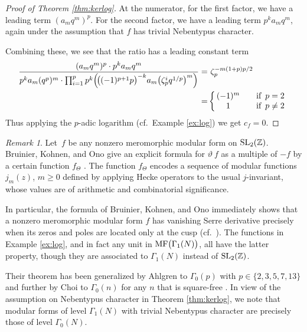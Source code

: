 \documentclass{gtpart}
\theoremstyle{definition}
\theoremstyle{remark}
\newtheorem{rmk}[equation]{Remark}
\newcommand{\mb}[1]{\mathbb{#1}}
\newcommand{\BZ}{{\mb Z}}
\newcommand{\MF}{{\rm MF}}
\newcommand{\G}{\Gamma}
\renewcommand{\=}{\approx}
\renewcommand{\-}{\sim}
\newcommand{\SL}{{\rm SL}}
\numberwithin{equation}{section}
\begin{document}
\begin{proof}[Proof of Theorem \ref{thm:kerlog}]
 At the numerator, for the first factor, we have a leading term $(a_m q^m)^p$.  
 For the second factor, we have a leading term $p^k a_m q^m$, again under the 
 assumption that $f$ has trivial Nebentypus character.  

 Combining these, we see that the ratio has a leading constant term 
 \[
  \begin{split}
   \frac{(a_m q^m)^p \cdot p^k a_m q^m}{p^k a_m (q^p)^m \cdot 
   \prod_{i=1}^p p^k \Big(\! \big( (-1)^{p + 1} p \big)^{-k} a_m 
   \big( \zeta_p^i q^{1/p} \big)^m \Big)} = & ~ \zeta_p^{-m (1 + p) p / 2} \\
   = & \left\{\!\!
        \begin{array}{cl}
         (-1)^m & \quad \text{if\, $p = 2$} \\
         1 & \quad \text{if\, $p \neq 2$} 
        \end{array}
       \right.
  \end{split}
 \]
 Thus applying the $p$-adic logarithm (cf.~Example \ref{ex:log}) we get 
 $c_f = 0$.  
\end{proof}

\begin{rmk}
 Let $\,f$ be any nonzero meromorphic modular form on $\SL_2(\BZ)$.  Bruinier, 
 Kohnen, and Ono give an explicit formula for $\vartheta ~\! f$ as a multiple of 
 $-f$ by a certain function $f_\Theta$ \cite[Theorem 1]{BKO}.  The function 
 $f_\Theta$ encodes a sequence of modular functions $j_m(z)$, $m \geq 0$ defined 
 by applying Hecke operators to the usual $j$-invariant, whose values are of 
 arithmetic and combinatorial significance.  

 In particular, the formula of Bruinier, Kohnen, and Ono immediately shows that 
 a nonzero meromorphic modular form $f$ has vanishing Serre derivative precisely 
 when its zeros and poles are located only at the cusp 
 (cf.~\cite[Proposition 6]{DumasRoyer}).  The functions in Example \ref{ex:log}, 
 and in fact any unit in $\MF\big(\G_1(N)\big)$, all have the latter property, 
 though they are associated to $\G_1(N)$ instead of $\SL_2(\BZ)$.  

 Their theorem has been generalized by Ahlgren to $\G_0(p)$ with 
 $p \in \{2,3,5,7,13\}$ \cite[Theorem 2]{Ahlgren} and further by Choi to 
 $\G_0(n)$ for any $n$ that is square-free \cite[Theorem 3.4]{Choi}.  In view of 
 the assumption on Nebentypus character in Theorem \ref{thm:kerlog}, we note 
 that modular forms of level $\G_1(N)$ with trivial Nebentypus character are 
 precisely those of level $\G_0(N)$.  
\end{rmk}
\end{document}
